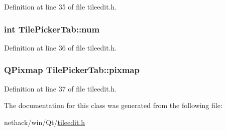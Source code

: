 Definition at line 35 of file tileedit.\+h.

\hypertarget{classTilePickerTab_a013d0f727803e49ad17dc56b97376fc6}{
\subsubsection[{num}]{\setlength{\rightskip}{0pt plus 5cm}int Tile\+Picker\+Tab\+::num\hspace{0.3cm}{\ttfamily [private]}}}\label{classTilePickerTab_a013d0f727803e49ad17dc56b97376fc6}


Definition at line 36 of file tileedit.\+h.

\hypertarget{classTilePickerTab_a40f1352a5c791719b1f2987df3f13c79}{
\subsubsection[{pixmap}]{\setlength{\rightskip}{0pt plus 5cm}Q\+Pixmap Tile\+Picker\+Tab\+::pixmap\hspace{0.3cm}{\ttfamily [private]}}}\label{classTilePickerTab_a40f1352a5c791719b1f2987df3f13c79}


Definition at line 37 of file tileedit.\+h.



The documentation for this class was generated from the following file\+:\begin{DoxyCompactItemize}
\item 
nethack/win/\+Qt/\hyperlink{tileedit_8h}{tileedit.\+h}\end{DoxyCompactItemize}

